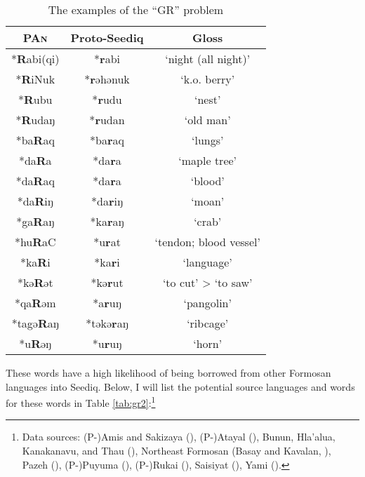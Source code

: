 \documentclass[12pt]{article}
\newcommand{\pan}{\textsc{PAn}\xspace}
\newcommand{\psedf}{Proto-Seediq\xspace}
\begin{document}
\begin{table}[!htbp]
\centering
\caption{The examples of the ``GR'' problem}
\label{tab:gr}
\begin{tabular}{ccc}
\hline
\pan      & \psedf   & Gloss                  \\ \hline
*\textbf{R}abi(qi) & *\textbf{r}abi    & `night (all night)'    \\
*\textbf{R}iNuk    & *\textbf{r}əhənuk & `k.o. berry'           \\
*\textbf{R}ubu     & *\textbf{r}udu    & `nest'                 \\
*\textbf{R}udaŋ    & *\textbf{r}udan   & `old man'              \\
*ba\textbf{R}aq    & *ba\textbf{r}aq   & `lungs'                \\
*da\textbf{R}a     & *da\textbf{r}a    & `maple tree'           \\
*da\textbf{R}aq    & *da\textbf{r}a    & `blood'                \\
*da\textbf{R}iŋ    & *da\textbf{r}iŋ   & `moan'                 \\
*ga\textbf{R}aŋ    & *ka\textbf{r}aŋ   & `crab'                 \\
*hu\textbf{R}aC    & *u\textbf{r}at    & `tendon; blood vessel' \\
*ka\textbf{R}i     & *ka\textbf{r}i    & `language'             \\
*kə\textbf{R}ət    & *kə\textbf{r}ut   & `to cut' > `to saw'    \\
*qa\textbf{R}əm    & *a\textbf{r}uŋ    & `pangolin'             \\
*tagə\textbf{R}aŋ  & *təkə\textbf{r}aŋ & `ribcage'              \\
*u\textbf{R}əŋ     & *u\textbf{r}uŋ    & `horn'                 \\ \hline
\end{tabular}
\end{table}

These words have a high likelihood of being borrowed from other Formosan languages into Seediq. Below, I will list the potential source languages and words for these words in Table \ref{tab:gr2}:\footnote{Data sources: (P-)Amis and Sakizaya (\cite{lin2022amisak, g0vAmismoedict}), (P-)Atayal (\cite{goderich2020phd}), Bunun, Hla'alua, Kanakanavu, and Thau (\cite{ILRDFEdict}), Northeast Formosan (Basay and Kavalan, \cite{tseng2022nef}), Pazeh (\cite{liandtsuchida2001paz}), (P-)Puyuma (\cite{ting1978puy, cauquelin2015puydict}), (P-)Rukai (\cite{li1977ruk}), Saisiyat (\cite{li1978say}), Yami (\cite{tsuchidaetal1987batanic}).}
\end{document}
